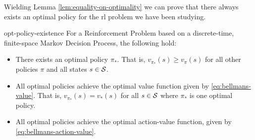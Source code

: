 Wielding Lemma \ref{lem:equality-on-optimality} we can prove that there always
exists an optimal policy for the \ac{rl} problem we have been studying.

\begin{thrm}{}{opt-policy-existence}
    For a Reinforcement Problem based on a discrete-time, finite-space Markov
    Decision Process, the following hold:
    \begin{itemize}
        \item There exists an optimal policy $\pi_*$. That is, $v_{\pi_*} (s)
            \geq v_{\pi}(s)$ for all other policies $\pi$ and all states $s \in
            \mathcal{S}$.
        \item All optimal policies achieve the optimal value function given by
            \eqref{eq:bellmans-value}. That is, $v_{\pi_*}(s) = v_* (s)$ for all
            $s \in \mathcal{S}$ where $\pi_*$ is one optimal policy.
        \item All optimal policies achieve the optimal action-value function,
            given by \eqref{eq:bellmans-action-value}.
    \end{itemize}
\end{thrm}

